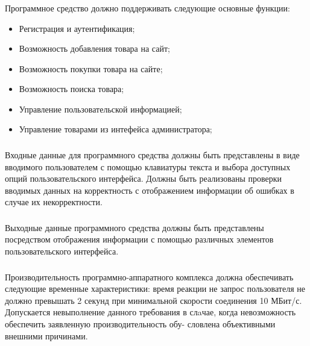 \subsubsection{}

Программное средство должно поддерживать следующие основные функции:
\begin{itemize}
  \item Регистрация и аутентификация;
  \item Возможность добавления товара на сайт;
  \item Возможность покупки товара на сайте;
  \item Возможность поиска товара;
  \item Управление пользовательской информацией;
  \item Управление товарами из интефейса администратора;
\end{itemize}

\subsubsection{}

Входные данные для программного средства должны быть представлены в виде вводимого пользователем с помощью клавиатуры текста и выбора доступных опций пользовательского интерфейса.
Должны быть реализованы проверки вводимых данных на корректность с отображением информации об ошибках в случае их некорректности.

\subsubsection{}

Выходные данные программного средства должны быть представлены посредством отображения информации с помощью различных элементов пользовательского интерфейса.

\subsubsection{}

Производительность программно-аппаратного комплекса должна обеспечивать следующие временные характеристики: время реакции не запрос пользователя не должно превышать 2 секунд при минимальной скорости соединения 10 МБит/с.
Допускается невыполнение данного требования в слaчае, когда невозможность обеспечить заявленную производительность обу- словлена объективными внешними причинами.

\subsubsection{}

